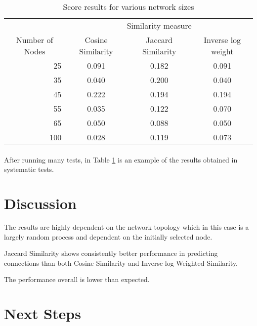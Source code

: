 \documentclass[12pt,a4paper]{report}
\begin{document}
\begin{table}[]
\centering
\label{results}
\begin{tabular}{rccc}
\cline{2-4}
\multicolumn{1}{l}{} & \multicolumn{3}{c}{Similarity measure} \\ \cline{2-4} 
\multicolumn{1}{c}{Number of Nodes} & Cosine Similarity & Jaccard Similarity & Inverse log weight \\
25 & 0.091 & 0.182 & 0.091 \\
35 & 0.040 & 0.200 & 0.040 \\
45 & 0.222 & 0.194 & 0.194 \\
55 & 0.035 & 0.122 & 0.070 \\
65 & 0.050 & 0.088 & 0.050 \\
100 & 0.028 & 0.119 & 0.073 \\ \cline{2-4} 
\end{tabular}
\caption{Score results for various network sizes }
\end{table}

\paragraph{} After running many tests, in Table \ref{results} is an example of the results obtained in systematic tests.

\section{Discussion} \begin{list}{•}{}
\item The results are highly dependent on the network topology which in this case is a largely random process and dependent on the initially selected node.
\item Jaccard Similarity shows consistently better performance in predicting connections than both Cosine Similarity and Inverse log-Weighted Similarity.
\item The performance overall is lower than expected.

\end{list}


\section{Next Steps}
\end{document}
